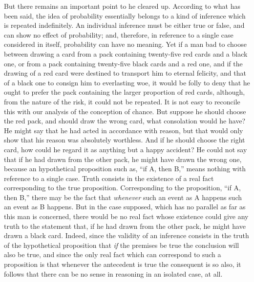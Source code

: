 But there remains an important point to he cleared up. According to what has been said, the idea of probability essentially belongs to a kind of inference which is repeated indefinitely. An individual inference must be either true or false, and can show no effect of probability; and, therefore, in reference to a single case considered in itself, probability can have no meaning. Yet if a man bad to choose between drawing a card from a pack containing twenty-five red cards and a black one, or from a pack containing twenty-five black cards and a red one, and if the drawing of a red card were destined to transport him to eternal felicity, and that of a black one to consign him to everlasting woe, it would be folly to deny that he ought to prefer the pack containing the larger proportion of red cards, although, from the nature of the risk, it could not be repeated. It is not easy to reconcile this with our analysis of the conception of chance. But suppose he should choose the red pack, and should draw the wrong card, what consolation would he have? He might say that he had acted in accordance with reason, but that would only show that his reason was absolutely worthless. And if he should choose the right card, how could he regard it as anything but a happy accident? He could not say that if he had drawn from the other pack, he might have drawn the wrong one, because an hypothetical proposition such as, ``if A, then B,'' means nothing with reference to a single case. Truth consists in the existence of a real fact corresponding to the true proposition. Corresponding to the proposition, ``if A, then B,'' there may be the fact that \emph{whenever} such an event as A happens such an event as B happens. But in the case supposed, which has no parallel as far as this man is concerned, there would be no real fact whose existence could give any truth to the statement that, if he had drawn from the other pack, he might have drawn a black card. Indeed, since the validity of an inference consists in the truth of the hypothetical proposition that \emph{if} the premises be true the conclusion will also be true, and since the only real fact which can correspond to such a proposition is that whenever the antecedent is true the consequent is so also, it follows that there can be no sense in reasoning in an isolated case, at all.

